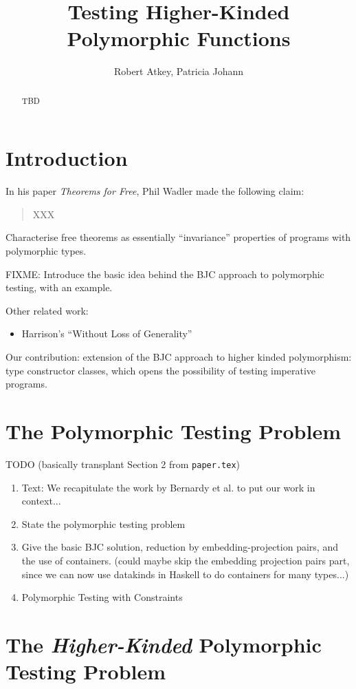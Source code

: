 \documentclass{llncs}
\title{Testing Higher-Kinded Polymorphic Functions}
\author{Robert Atkey\inst{1}, Patricia Johann\inst{2}}
\institute{Computer and Information Sciences,
University of Strathclyde
\and
Computer Science Department,
Appalachian State University
}
\begin{document}
\maketitle

\begin{abstract}
  TBD
\end{abstract}

\section{Introduction}

In his paper \emph{Theorems for Free}, Phil Wadler made the following
claim:
\begin{quotation}
  XXX
\end{quotation}
Characterise free theorems as essentially ``invariance'' properties of
programs with polymorphic types.

FIXME: Introduce the basic idea behind the BJC approach to polymorphic
testing, with an example.

Other related work:
\begin{itemize}
\item Harrison's ``Without Loss of Generality''
\end{itemize}

Our contribution: extension of the BJC approach to higher kinded
polymorphism: type constructor classes, which opens the possibility of
testing imperative programs.

\section{The Polymorphic Testing Problem}

TODO (basically transplant Section 2 from \texttt{paper.tex})
\begin{enumerate}
\item Text: We recapitulate the work by Bernardy et al. to put our
  work in context...
\item State the polymorphic testing problem
\item Give the basic BJC solution, reduction by embedding-projection
  pairs, and the use of containers. (could maybe skip the embedding
  projection pairs part, since we can now use datakinds in Haskell to
  do containers for many types...)
\item Polymorphic Testing with Constraints
\end{enumerate}

\section{The \emph{Higher-Kinded} Polymorphic Testing Problem}
\end{document}
